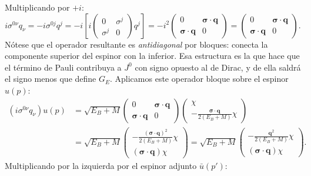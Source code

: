 \documentclass[10pt,a4paper]{article}
\begin{document}
Multiplicando por $+i$:
\begin{equation}
i \sigma^{0\nu} q_\nu = - i \sigma^{0j} q^j = - i \left[ i \begin{pmatrix} 0 & \sigma^j \\ \sigma^j & 0 \end{pmatrix} q^j \right] = - i^2 \begin{pmatrix} 0 & \boldsymbol{\sigma} \cdot \mathbf{q} \\ \boldsymbol{\sigma} \cdot \mathbf{q} & 0 \end{pmatrix} = \begin{pmatrix} 0 & \boldsymbol{\sigma} \cdot \mathbf{q} \\ \boldsymbol{\sigma} \cdot \mathbf{q} & 0 \end{pmatrix}.
\end{equation}
Nótese que el operador resultante es \emph{antidiagonal} por bloques: conecta la componente superior del espinor con la inferior. Esa estructura es la que hace que el término de Pauli contribuya a $J^0$ con signo opuesto al de Dirac, y de ella saldrá el signo menos que define $G_E$. Aplicamos este operador bloque sobre el espinor $u(p)$:
\begin{align}
(i \sigma^{0\nu} q_\nu) u(p) &= \sqrt{E_B + M} \begin{pmatrix} 0 & \boldsymbol{\sigma} \cdot \mathbf{q} \\ \boldsymbol{\sigma} \cdot \mathbf{q} & 0 \end{pmatrix} \begin{pmatrix} \chi \\ -\frac{\boldsymbol{\sigma} \cdot \mathbf{q}}{2(E_B + M)} \chi \end{pmatrix} \nonumber \\
&= \sqrt{E_B + M} \begin{pmatrix} -\frac{(\boldsymbol{\sigma} \cdot \mathbf{q})^2}{2(E_B + M)} \chi \\ (\boldsymbol{\sigma} \cdot \mathbf{q}) \chi \end{pmatrix} = \sqrt{E_B + M} \begin{pmatrix} -\frac{\mathbf{q}^2}{2(E_B + M)} \chi \\ (\boldsymbol{\sigma} \cdot \mathbf{q}) \chi \end{pmatrix}.
\end{align}
Multiplicando por la izquierda por el espinor adjunto $\bar{u}(p')$:
\end{document}
